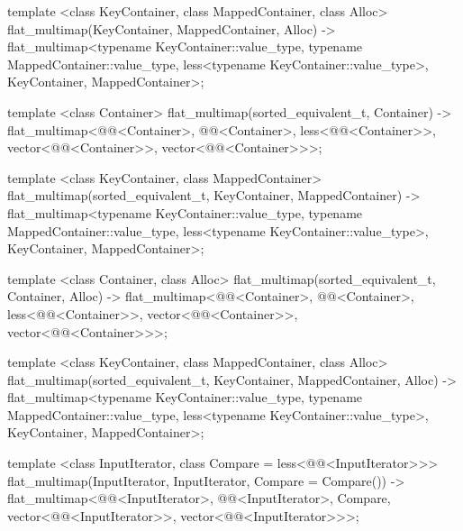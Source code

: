 \begin{codeblock}
\begin{codeblock}
\begin{codeblock}
\begin{addedblock}
\begin{codeblock}
{  template <class KeyContainer, class MappedContainer, class Alloc>
    flat_multimap(KeyContainer, MappedContainer, Alloc)
      -> flat_multimap<typename KeyContainer::value_type,
                       typename MappedContainer::value_type,
                       less<typename KeyContainer::value_type>,
                       KeyContainer, MappedContainer>;

  template <class Container>
    flat_multimap(sorted_equivalent_t, Container)
      -> flat_multimap<@@<Container>, @@<Container>,
                       less<@@<Container>>,
                       vector<@@<Container>>,
                       vector<@@<Container>>>;

  template <class KeyContainer, class MappedContainer>
    flat_multimap(sorted_equivalent_t, KeyContainer, MappedContainer)
      -> flat_multimap<typename KeyContainer::value_type,
                       typename MappedContainer::value_type,
                       less<typename KeyContainer::value_type>,
                       KeyContainer, MappedContainer>;

  template <class Container, class Alloc>
    flat_multimap(sorted_equivalent_t, Container, Alloc)
      -> flat_multimap<@@<Container>, @@<Container>,
                       less<@@<Container>>,
                       vector<@@<Container>>,
                       vector<@@<Container>>>;

  template <class KeyContainer, class MappedContainer, class Alloc>
    flat_multimap(sorted_equivalent_t, KeyContainer, MappedContainer, Alloc)
      -> flat_multimap<typename KeyContainer::value_type,
                       typename MappedContainer::value_type,
                       less<typename KeyContainer::value_type>,
                       KeyContainer, MappedContainer>;

  template <class InputIterator, class Compare = less<@@<InputIterator>>>
    flat_multimap(InputIterator, InputIterator, Compare = Compare())
      -> flat_multimap<@@<InputIterator>, @@<InputIterator>, Compare,
                       vector<@@<InputIterator>>,
                       vector<@@<InputIterator>>>;

}
\end{codeblock}
\end{addedblock}
\end{codeblock}
\end{codeblock}
\end{codeblock}
